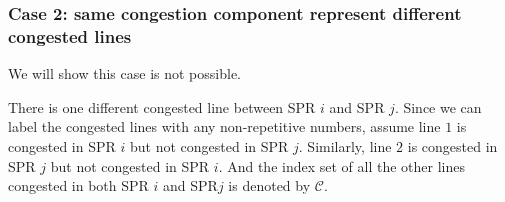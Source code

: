 \documentclass[letterpaper, 11pt]{article}
\theoremstyle{plain}
\theoremstyle{definition}
\begin{document}
\subsubsection{Case 2: same congestion component represent different congested lines} \label{ssub:case_2_marginal_generators_are_the_same_but_there_is_one_different_congested_line_}
We will show this case is not possible.



There is one different congested line between SPR $i$ and SPR $j$. Since we can label the congested lines with any non-repetitive numbers, assume line $1$ is congested in SPR $i$ but not congested in SPR $j$. Similarly, line $2$ is congested in SPR $j$ but not congested in SPR $i$. And the index set of all the other lines congested in both SPR $i$ and SPR$j$ is denoted by $\mathcal{C}$.
\end{document}
